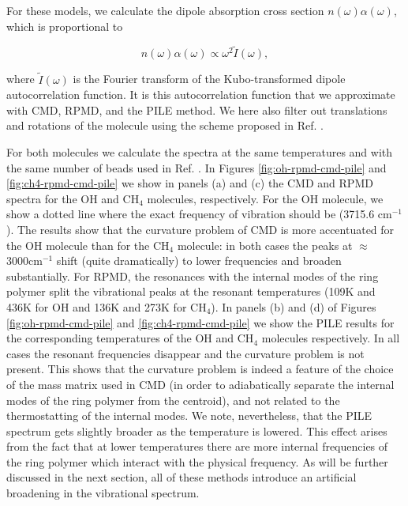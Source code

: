 \documentclass[aps,prb,superscriptaddress,amsmath,amssymb,showpacs,twocolumn]{revtex4}
\begin{document}
For these models, we calculate the dipole absorption cross section $n(\omega)\alpha(\omega)$, which is proportional to 

\begin{equation}
n(\omega)\alpha(\omega) \propto \omega^2  \tilde{I}(\omega),
\end{equation}

\noindent where $\tilde{I}(\omega)$ is the Fourier transform of the Kubo-transformed dipole autocorrelation function.
It is this autocorrelation function that we approximate with CMD, RPMD, and the PILE method. We here also filter out
translations and rotations of the molecule using the scheme proposed in Ref. \cite{witt+09jcp}.


For  both molecules we calculate the spectra at the same temperatures and with the same number of beads used in Ref. \cite{witt+09jcp}.  
In Figures \ref{fig:oh-rpmd-cmd-pile} and \ref{fig:ch4-rpmd-cmd-pile} we show 
in panels (a) and (c) the CMD and RPMD 
spectra for the OH and CH$_4$ molecules, respectively.
For the OH molecule, we show a dotted line where the
exact frequency of vibration should be (3715.6 cm$^{-1}$). 
The results show that the curvature problem of CMD is more 
accentuated for the OH molecule than for the CH$_4$ molecule: in
both cases the peaks at $\approx$ 3000cm$^{-1}$ shift (quite dramatically)
to lower frequencies and broaden substantially. 
For RPMD, the resonances with the internal modes of the ring polymer
split the vibrational peaks at the resonant temperatures (109K and 436K for
OH and 136K and 273K for CH$_4$). In panels (b) and (d) of Figures  \ref{fig:oh-rpmd-cmd-pile} and \ref{fig:ch4-rpmd-cmd-pile} we show the PILE results for the corresponding temperatures of the OH and CH$_4$ molecules
respectively. In all cases the resonant frequencies disappear and the curvature problem is not present. 
This shows that the curvature problem is indeed a feature of the choice
of the mass matrix used in CMD (in order to adiabatically separate the 
internal modes of the ring polymer from the centroid), 
and not related to the thermostatting of the internal modes.
We note, nevertheless, that the PILE
spectrum gets slightly broader as the temperature is lowered. 
This effect arises from the fact that at lower
temperatures there are more internal frequencies of the
 ring polymer which interact with the physical frequency.
 As will be further discussed in the next section, all
 of these methods introduce an artificial broadening in the vibrational spectrum.
\end{document}
